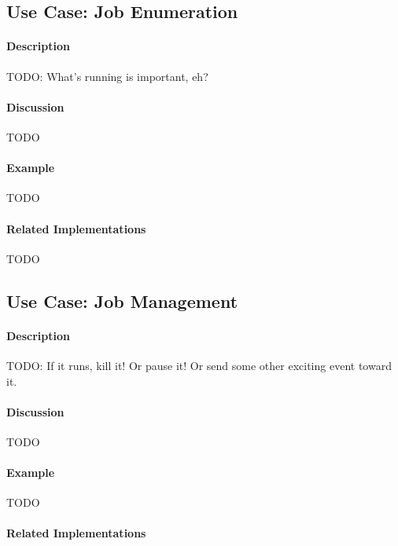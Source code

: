 \subsection{Use Case: Job Enumeration}

\paragraph{Description}

{\Large TODO:} What's running is important, eh?

\paragraph{Discussion}

{\Large TODO}

\paragraph{Example}

{\Large TODO}

\paragraph{Related Implementations}

{\Large TODO}

\subsection{Use Case: Job Management}

\paragraph{Description}

{\Large TODO:} If it runs, kill it!  Or pause it!  Or send some other exciting event toward it.

\paragraph{Discussion}

{\Large TODO}

\paragraph{Example}

{\Large TODO}

\paragraph{Related Implementations}

